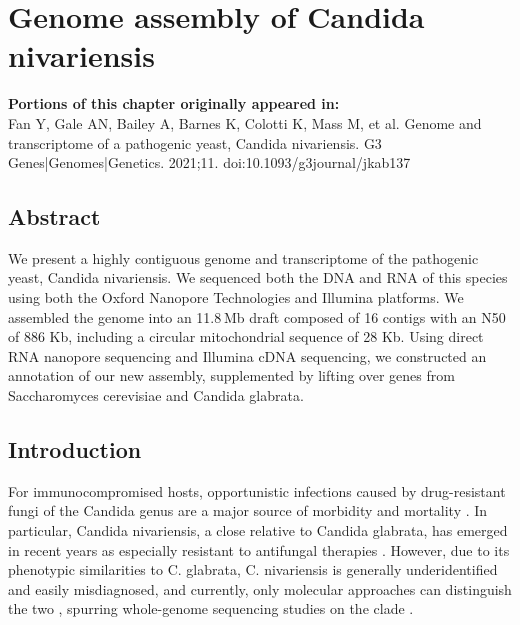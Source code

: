 \chapter{Genome assembly of Candida nivariensis}
\label{chap:nivar}

\textbf{Portions of this chapter originally appeared in:} \\
Fan Y, Gale AN, Bailey A, Barnes K, Colotti K, Mass M, et al. Genome and transcriptome of a pathogenic yeast, Candida nivariensis. G3 Genes|Genomes|Genetics. 2021;11. doi:10.1093/g3journal/jkab137

\section{Abstract}
\label{sec:abstract}

We present a highly contiguous genome and transcriptome of the pathogenic yeast, Candida nivariensis. We sequenced both the DNA and RNA of this species using both the Oxford Nanopore Technologies and Illumina platforms. We assembled the genome into an 11.8 Mb draft composed of 16 contigs with an N50 of 886 Kb, including a circular mitochondrial sequence of 28 Kb. Using direct RNA nanopore sequencing and Illumina cDNA sequencing, we constructed an annotation of our new assembly, supplemented by lifting over genes from Saccharomyces cerevisiae and Candida glabrata.

\section{Introduction}
\label{sec:intro}

For immunocompromised hosts, opportunistic infections caused by drug-resistant fungi of the Candida genus are a major source of morbidity and mortality \citep{Borman2008-cr}. In particular, Candida nivariensis, a close relative to Candida glabrata, has emerged in recent years as especially resistant to antifungal therapies \citep{Borman2008-cr}. However, due to its phenotypic similarities to C. glabrata, C. nivariensis is generally underidentified and easily misdiagnosed, and currently, only molecular approaches can distinguish the two \citep{Aznar-Marin2016-yp}, spurring whole-genome sequencing studies on the clade \citep{Gabaldon2013-bk}.

